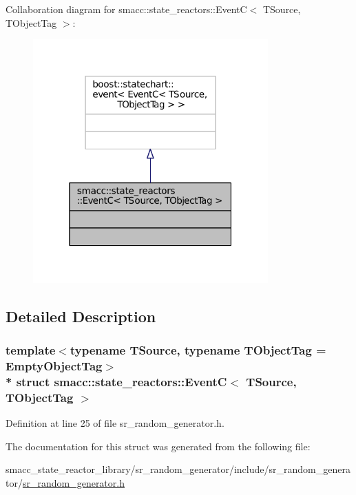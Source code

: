 Collaboration diagram for smacc\+:\+:state\+\_\+reactors\+:\+:EventC$<$ T\+Source, T\+Object\+Tag $>$\+:
\nopagebreak
\begin{figure}[H]
\begin{center}
\leavevmode
\includegraphics[width=256pt]{structsmacc_1_1state__reactors_1_1EventC__coll__graph}
\end{center}
\end{figure}


\subsection{Detailed Description}
\subsubsection*{template$<$typename T\+Source, typename T\+Object\+Tag = Empty\+Object\+Tag$>$\\*
struct smacc\+::state\+\_\+reactors\+::\+Event\+C$<$ T\+Source, T\+Object\+Tag $>$}



Definition at line 25 of file sr\+\_\+random\+\_\+generator.\+h.



The documentation for this struct was generated from the following file\+:\begin{DoxyCompactItemize}
\item 
smacc\+\_\+state\+\_\+reactor\+\_\+library/sr\+\_\+random\+\_\+generator/include/sr\+\_\+random\+\_\+generator/\hyperlink{sr__random__generator_8h}{sr\+\_\+random\+\_\+generator.\+h}\end{DoxyCompactItemize}
